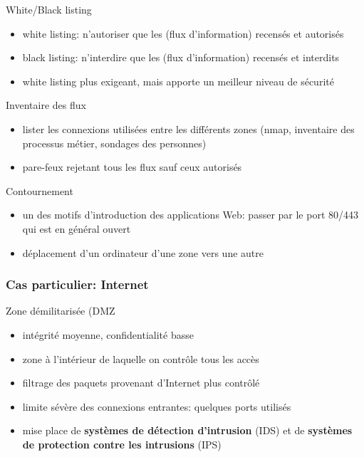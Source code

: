 \begin{reveals}
\begin{frame}
  \vfill
  \begin{block}{White/Black listing}
    \begin{itemize}
    \item white listing: n'autoriser que les (flux d'information) recensés et autorisés
    \item black listing: n'interdire que les (flux d'information) recensés et interdits
    \item white listing plus exigeant, mais apporte un meilleur niveau de sécurité
    \end{itemize}
  \end{block}

  \vfill


   \begin{block}{Inventaire des flux}
     \begin{itemize}
     \item lister les connexions utilisées entre les différents zones
       (nmap, inventaire des processus métier, sondages des personnes)
     \item pare-feux rejetant tous les flux sauf ceux autorisés
     \end{itemize}
  \end{block}

  \vfill
\begin{block}{Contournement}
  \begin{itemize}
  \item un des motifs d'introduction des applications Web: passer par
    le port 80/443 qui est en général ouvert
  \item déplacement d'un ordinateur d'une zone vers une autre
  \end{itemize}
  \end{block}

  \vfill
\end{frame}

\begin{frame}
  \frametitle{Cas particulier: Internet}

  \vfill

   \begin{block}{Zone démilitarisée (DMZ}
     \begin{itemize}
     \item intégrité moyenne, confidentialité basse
     \item zone à l'intérieur de laquelle on contrôle tous les accès
     \item filtrage des paquets provenant d'Internet plus contrôlé
     \item limite sévère des connexions entrantes: quelques ports utilisés
     \item mise place de \textbf{systèmes de détection d'intrusion}
       (IDS) et de \textbf{systèmes de protection contre les
         intrusions} (IPS)
     \end{itemize}
  \end{block}


\end{frame}
\end{reveals}
